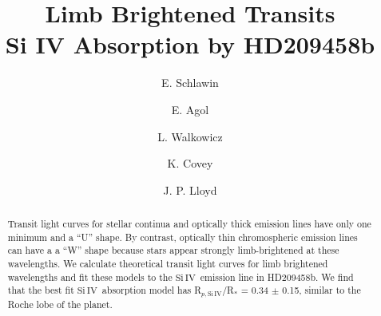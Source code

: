 \documentclass[manuscript]{aastex}
\newcommand{\siIV}{\ensuremath{\mathrm{Si}\,\scriptstyle \mathrm{IV}}}
\begin{document}

\title{Limb Brightened Transits \\
Si IV Absorption by HD209458b}


\author{E. Schlawin} 
\author{E. Agol}
\author{L. Walkowicz}
\author{K. Covey}
\author{J. P. Lloyd}






\begin{abstract}
Transit light curves for stellar continua and optically thick emission lines have only one minimum and a  ``U'' shape. By contrast, optically thin chromospheric emission lines can have a  a ``W'' shape because stars appear strongly limb-brightened at these wavelengths. We calculate theoretical transit light curves for limb brightened wavelengths and fit these models to the \siIV\ emission line in HD209458b. We find that the best fit \siIV\ absorption model has R$_{p,\siIV}$/R$_*$ = 0.34 $\pm$ 0.15, similar to the Roche lobe of the planet.
\end{abstract}
\end{document}
